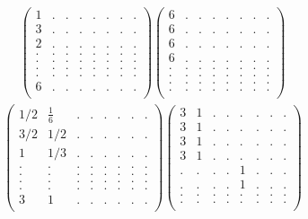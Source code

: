 \documentclass[12pt,a4paper]{amsart}
\begin{document}
\begin{align*}
\left(\begin{array}{rrrrrrrr}%
1&.&.&.&.&.&.&.\\%
3&.&.&.&.&.&.&.\\%
2&.&.&.&.&.&.&.\\%
.&.&.&.&.&.&.&.\\%
.&.&.&.&.&.&.&.\\%
.&.&.&.&.&.&.&.\\%
.&.&.&.&.&.&.&.\\%
6&.&.&.&.&.&.&.\\%
\end{array}\right)%
\left(\begin{array}{rrrrrrrr}%
6&.&.&.&.&.&.&.\\%
6&.&.&.&.&.&.&.\\%
6&.&.&.&.&.&.&.\\%
6&.&.&.&.&.&.&.\\%
.&.&.&.&.&.&.&.\\%
.&.&.&.&.&.&.&.\\%
.&.&.&.&.&.&.&.\\%
.&.&.&.&.&.&.&.\\%
\end{array}\right)%
\end{align*}
\begin{align*}
\left(\begin{array}{rrrrrrrr}%
1/2&\frac{1}{6}&.&.&.&.&.&.\\%
3/2&1/2&.&.&.&.&.&.\\%
1&1/3&.&.&.&.&.&.\\%
.&.&.&.&.&.&.&.\\%
.&.&.&.&.&.&.&.\\%
.&.&.&.&.&.&.&.\\%
.&.&.&.&.&.&.&.\\%
3&1&.&.&.&.&.&.\\%
\end{array}\right)%
\left(\begin{array}{rrrrrrrr}%
3&1&.&.&.&.&.&.\\%
3&1&.&.&.&.&.&.\\%
3&1&.&.&.&.&.&.\\%
3&1&.&.&.&.&.&.\\%
.&.&.&.&1&.&.&.\\%
.&.&.&.&1&.&.&.\\%
.&.&.&.&.&.&.&.\\%
.&.&.&.&.&.&.&.\\%
\end{array}\right)%
\end{align*}
\end{document}
